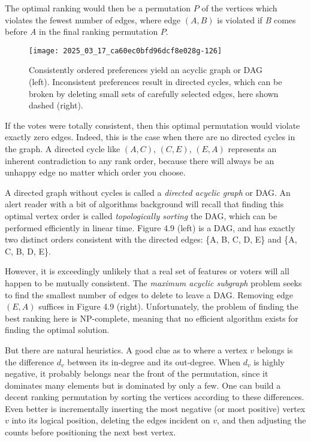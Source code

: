 \documentclass[10pt]{article}
\begin{document}
The optimal ranking would then be a permutation \(P\) of the vertices which violates the fewest number of edges, where edge \((A, B)\) is violated if \textit{B} comes before \textit{A} in the final ranking permutation \(P\).

\begin{figure}
    \centering
    \texttt{[image: 2025\_03\_17\_ca60ec0bfd96dcf8e028g-126]}
    \caption{Consistently ordered preferences yield an acyclic graph or DAG (left). Inconsistent preferences result in directed cycles, which can be broken by deleting small sets of carefully selected edges, here shown dashed (right).}
\end{figure}

If the votes were totally consistent, then this optimal permutation would violate exactly zero edges. Indeed, this is the case when there are no directed cycles in the graph. A directed cycle like \((A, C)\), \((C, E)\), \((E, A)\) represents an inherent contradiction to any rank order, because there will always be an unhappy edge no matter which order you choose.

A directed graph without cycles is called a \textit{directed acyclic graph} or DAG. An alert reader with a bit of algorithms background will recall that finding this optimal vertex order is called \textit{topologically sorting} the DAG, which can be performed efficiently in linear time. Figure 4.9 (left) is a DAG, and has exactly two distinct orders consistent with the directed edges: \{A, B, C, D, E\} and \{A, C, B, D, E\}.

However, it is exceedingly unlikely that a real set of features or voters will all happen to be mutually consistent. The \textit{maximum acyclic subgraph} problem seeks to find the smallest number of edges to delete to leave a DAG. Removing edge \((E, A)\) suffices in Figure 4.9 (right). Unfortunately, the problem of finding the best ranking here is NP-complete, meaning that no efficient algorithm exists for finding the optimal solution.

But there are natural heuristics. A good clue as to where a vertex \(v\) belongs is the difference \(d_v\) between its in-degree and its out-degree. When \(d_v\) is highly negative, it probably belongs near the front of the permutation, since it dominates many elements but is dominated by only a few. One can build a decent ranking permutation by sorting the vertices according to these differences. Even better is incrementally inserting the most negative (or most positive) vertex \(v\) into its logical position, deleting the edges incident on \(v\), and then adjusting the counts before positioning the next best vertex.
\end{document}
